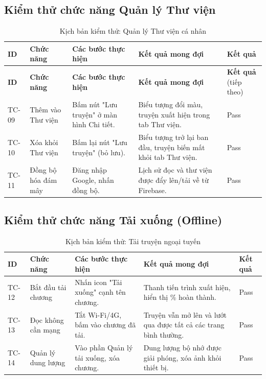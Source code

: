 \subsection{Kiểm thử chức năng Quản lý Thư viện}
\begin{longtable}{|p{1.2cm}|p{3.2cm}|p{4.2cm}|p{3.5cm}|p{1.4cm}|}
    \caption{Kịch bản kiểm thử: Quản lý Thư viện cá nhân} \label{tab:test_library} \\
    \hline
    \textbf{ID} & \textbf{Chức năng} & \textbf{Các bước thực hiện} & \textbf{Kết quả mong đợi} & \textbf{Kết quả} \\ \hline
    \endfirsthead %

    \hline
    \textbf{ID} & \textbf{Chức năng} & \textbf{Các bước thực hiện} & \textbf{Kết quả mong đợi} & \textbf{Kết quả} (tiếp theo) \\ \hline
    \endhead %

    TC-09 & Thêm vào Thư viện & Bấm nút "Lưu truyện" ở màn hình Chi tiết. & Biểu tượng đổi màu, truyện xuất hiện trong tab Thư viện. & Pass \\ \hline
    TC-10 & Xóa khỏi Thư viện & Bấm lại nút "Lưu truyện" (bỏ lưu). & Biểu tượng trở lại ban đầu, truyện biến mất khỏi tab Thư viện. & Pass \\ \hline
    TC-11 & Đồng bộ hóa đám mây & Đăng nhập Google, nhấn đồng bộ. & Lịch sử đọc và thư viện được đẩy lên/tải về từ Firebase. & Pass \\ \hline
\end{longtable}

\subsection{Kiểm thử chức năng Tải xuống (Offline)}
\begin{table}[H]
    \centering
    \caption{Kịch bản kiểm thử: Tải truyện ngoại tuyến}
    \label{tab:test_download}
    \begin{tabular}{|p{1.2cm}|p{3.2cm}|p{4.2cm}|p{3.5cm}|p{1.4cm}|}
    \hline
    \textbf{ID} & \textbf{Chức năng} & \textbf{Các bước thực hiện} & \textbf{Kết quả mong đợi} & \textbf{Kết quả} \\ \hline
    TC-12 & Bắt đầu tải chương & Nhấn icon "Tải xuống" cạnh tên chương. & Thanh tiến trình xuất hiện, hiển thị \% hoàn thành. & Pass \\ \hline
    TC-13 & Đọc không cần mạng & Tắt Wi-Fi/4G, bấm vào chương đã tải. & Truyện vẫn mở lên và lướt qua được tất cả các trang bình thường. & Pass \\ \hline
    TC-14 & Quản lý dung lượng & Vào phần Quản lý tải xuống, xóa chương. & Dung lượng bộ nhớ được giải phóng, xóa ảnh khỏi thiết bị. & Pass \\ \hline
    \end{tabular}
\end{table}

